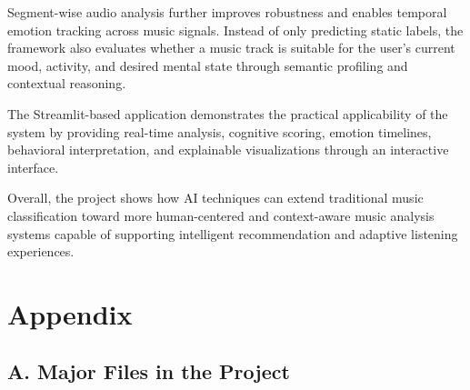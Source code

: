 \documentclass[12pt,a4paper]{report}
\begin{document}
Segment-wise audio analysis further improves robustness and enables temporal emotion tracking across music signals. Instead of only predicting static labels, the framework also evaluates whether a music track is suitable for the user’s current mood, activity, and desired mental state through semantic profiling and contextual reasoning.

The Streamlit-based application demonstrates the practical applicability of the system by providing real-time analysis, cognitive scoring, emotion timelines, behavioral interpretation, and explainable visualizations through an interactive interface.

Overall, the project shows how AI techniques can extend traditional music classification toward more human-centered and context-aware music analysis systems capable of supporting intelligent recommendation and adaptive listening experiences.


\chapter*{Appendix}

\section*{A. Major Files in the Project}
\end{document}
